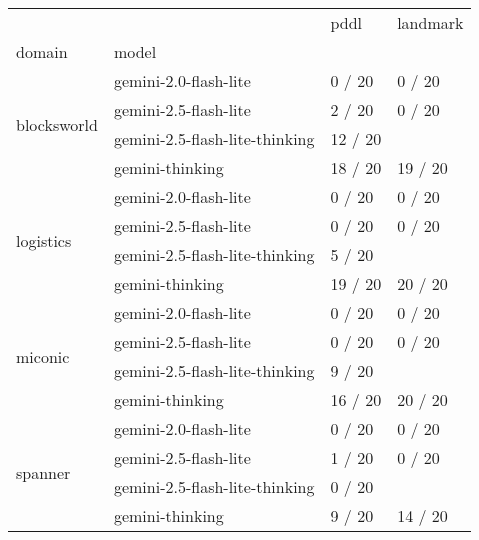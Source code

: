 \begin{tabular}{llll}
\toprule
 &  & pddl & landmark \\
domain & model &  &  \\
\midrule
\multirow[t]{4}{*}{blocksworld} & gemini-2.0-flash-lite & 0 / 20 & 0 / 20 \\
 & gemini-2.5-flash-lite & 2 / 20 & 0 / 20 \\
 & gemini-2.5-flash-lite-thinking & 12 / 20 &  \\
 & gemini-thinking & 18 / 20 & 19 / 20 \\
\cline{1-4}
\multirow[t]{4}{*}{logistics} & gemini-2.0-flash-lite & 0 / 20 & 0 / 20 \\
 & gemini-2.5-flash-lite & 0 / 20 & 0 / 20 \\
 & gemini-2.5-flash-lite-thinking & 5 / 20 &  \\
 & gemini-thinking & 19 / 20 & 20 / 20 \\
\cline{1-4}
\multirow[t]{4}{*}{miconic} & gemini-2.0-flash-lite & 0 / 20 & 0 / 20 \\
 & gemini-2.5-flash-lite & 0 / 20 & 0 / 20 \\
 & gemini-2.5-flash-lite-thinking & 9 / 20 &  \\
 & gemini-thinking & 16 / 20 & 20 / 20 \\
\cline{1-4}
\multirow[t]{4}{*}{spanner} & gemini-2.0-flash-lite & 0 / 20 & 0 / 20 \\
 & gemini-2.5-flash-lite & 1 / 20 & 0 / 20 \\
 & gemini-2.5-flash-lite-thinking & 0 / 20 &  \\
 & gemini-thinking & 9 / 20 & 14 / 20 \\
\cline{1-4}
\end{tabular}